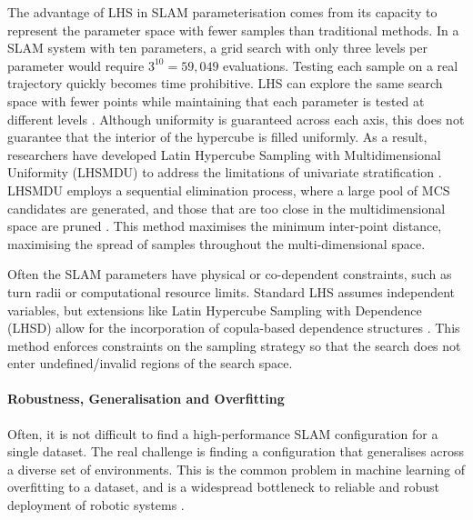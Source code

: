 The advantage of LHS in SLAM parameterisation comes from its capacity to represent the parameter space with fewer samples than traditional methods. In a SLAM system with ten parameters, a grid search with only three levels per parameter would require $3^{10} = 59,049$ evaluations. Testing each sample on a real trajectory quickly becomes time prohibitive. LHS can explore the same search space with fewer points while maintaining that each parameter is tested at different levels \cite{deutschLatinHypercubeSampling2012}. Although uniformity is guaranteed across each axis, this does not guarantee that the interior of the hypercube is filled uniformly. As a result, researchers have developed Latin Hypercube Sampling with Multidimensional Uniformity (LHSMDU) to address the limitations of univariate stratification \cite{deutschLatinHypercubeSampling2012}. LHSMDU employs a sequential elimination process, where a large pool of MCS candidates are generated, and those that are too close in the multidimensional space are pruned \cite{deutschLatinHypercubeSampling2012}. This method maximises the minimum inter-point distance, maximising the spread of samples throughout the multi-dimensional space.

Often the SLAM parameters have physical or co-dependent constraints, such as turn radii or computational resource limits.
Standard LHS assumes independent variables, but extensions like Latin Hypercube Sampling with Dependence (LHSD) allow for the incorporation of copula-based dependence structures \cite{packhamLatinHypercubeSampling2008}. This method enforces constraints on the sampling strategy so that the search does not enter undefined/invalid regions of the search space. 

\paragraph{Robustness, Generalisation and Overfitting}
Often, it is not difficult to find a high-performance SLAM configuration for a single dataset. The real challenge is finding a configuration that generalises across a diverse set of environments. This is the common problem in machine learning of overfitting to a dataset, and is a widespread bottleneck to reliable and robust deployment of robotic systems \cite{soaresVARSLAMVisualAdaptive2025}. 


